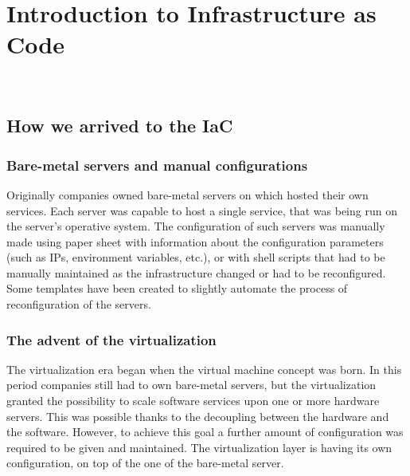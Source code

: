 
\chapter{Introduction to Infrastructure as Code}
\label{cap:introduction-to-iac}

\\



\section{How we arrived to the IaC}
\label{sec:story-iac}

\subsection{Bare-metal servers and manual configurations}
Originally companies owned bare-metal servers on which hosted their own services.
Each server was capable to host a single service, that was being run on the server's operative system.
The configuration of such servers was manually made using paper sheet with information about the configuration parameters (such as IPs, environment variables, etc.), or with shell scripts that had to be manually maintained as the infrastructure changed or had to be reconfigured.
Some templates have been created to slightly automate the process of reconfiguration of the servers.\\

\subsection{The advent of the virtualization}
The virtualization era began when the virtual machine concept was born.
In this period companies still had to own bare-metal servers, but the virtualization granted the possibility to scale software services upon one or more hardware servers.
This was possible thanks to the decoupling between the hardware and the software.
However, to achieve this goal a further amount of configuration was required to be given and maintained.
The virtualization layer is having its own configuration, on top of the one of the bare-metal server.\\

